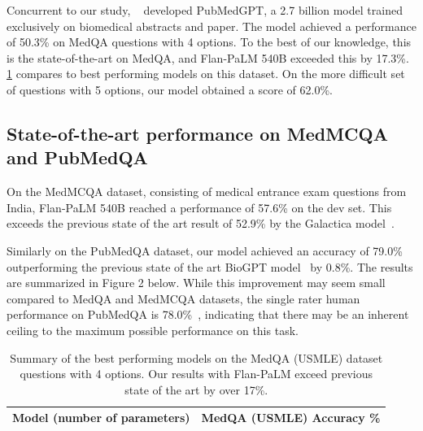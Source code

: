 \documentclass[10pt, letter, onecolumn]{arxiv}
\begin{document}
\begin{refsection}
Concurrent to our study, ~\citet{bolton2022pubmedgpt} developed PubMedGPT, a 2.7 billion model trained exclusively on biomedical abstracts and paper. The model achieved a performance of 50.3\% on MedQA questions with 4 options. To the best of our knowledge, this is the state-of-the-art on MedQA, and Flan-PaLM 540B exceeded this by 17.3\%. \cref{tab:medqa_result_comparison} compares to best performing models on this dataset. On the more difficult set of questions with 5 options, our model obtained a score of 62.0\%.

\subsection{State-of-the-art performance on MedMCQA and PubMedQA}

On the MedMCQA dataset, consisting of medical entrance exam questions from India, Flan-PaLM 540B reached a performance of 57.6\% on the dev set. This exceeds the previous state of the art result of 52.9\% by the Galactica model~\cite{taylor2022galactica}. 

Similarly on the PubMedQA dataset, our model achieved an accuracy of 79.0\% outperforming the previous state of the art BioGPT model~\citet{luo2022biogpt} by 0.8\%. The results are summarized in Figure 2 below. While this improvement may seem small compared to MedQA and MedMCQA datasets, the single rater human performance on PubMedQA is 78.0\%~\cite{jin2021disease}, indicating that there may be an inherent ceiling to the maximum possible performance on this task.

\begin{table}[ht]
\small
\centering
\caption{Summary of the best performing models on the MedQA (USMLE) dataset questions with 4 options. Our results with Flan-PaLM exceed previous state of the art by over 17\%.}
\vspace{3pt}
\label{tab:medqa_result_comparison}
\begin{tabular}{lc}
\toprule
\textbf{Model (number of parameters)} &
\textbf{MedQA (USMLE) Accuracy \%} \\ \midrule


\end{tabular}
\end{table}
\end{refsection}
\end{document}
